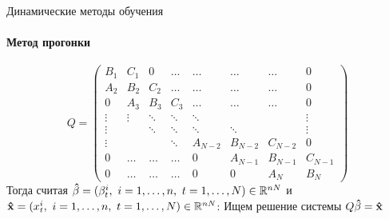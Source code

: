 \documentclass[11pt]{beamer}
\begin{document}
\begin{frame}{Динамические методы обучения}
\framesubtitle{Метод прогонки}
\begin{equation*}
    \label{matrix_progonka}
    Q = \begin{pmatrix}
    B_1   & C_1 & 0 & \dots  & \dots     & \dots     & \dots     & 0         \\
    A_2   & B_2                      & C_2                   & \dots  & \dots     & \dots     & \dots     & 0         \\
    0      & A_3                      & B_3                   & C_3   & \dots     & \dots     & \dots     & 0         \\
    \vdots & \vdots                    & \ddots                 & \ddots & \ddots    &           &           & \vdots    \\
    \vdots &                           & \ddots                 & \ddots & \ddots    & \ddots    &           & \vdots    \\
    \vdots &                           &                        & \ddots & A_{N-2} & B_{N-2} & C_{N-2} & 0         \\
    0      & \dots                     & \dots                  & \dots  & 0         & A_{N-1} & B_{N-1} & C_{N-1} \\
    0      & \dots                     & \dots                  & \dots  & 0         & 0         & A_N      & B_N     
    \end{pmatrix}
\end{equation*}
Тогда считая ${\bf \hat \beta} = (\beta_t^i,\ i=1,\dots,n,\  t=1,\dots,N) \in \mathbb R^{nN}$ и ${\bf \hat x} = (x_t^i,\ i=1,\dots,n,\  t=1,\dots,N) \in \mathbb R^{nN}$: Ищем решение системы
$Q {\bf \hat \beta} = {\bf \hat x}$
\end{frame}
\end{document}

